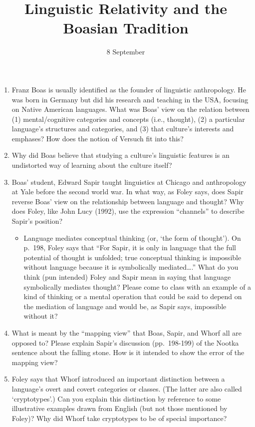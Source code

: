 \documentclass[doc,12pt]{apa6}
\providecommand{\tightlist}{%
  \setlength{\itemsep}{0pt}\setlength{\parskip}{0pt}}
\begin{document}
\title{Linguistic Relativity and the Boasian Tradition}
\author{8 September}
\maketitle

\begin{enumerate}
\def\labelenumi{\arabic{enumi}.}
\tightlist
\item
  Franz Boas is usually identified as the founder of linguistic
  anthropology. He was born in Germany but did his research and teaching
  in the USA, focusing on Native American languages. What was Boas' view
  on the relation between (1) mental/cognitive categories and concepts
  (i.e., thought), (2) a particular language's structures and
  categories, and (3) that culture's interests and emphases? How does
  the notion of Versuch fit into this?
\item
  Why did Boas believe that studying a culture's linguistic features is
  an undistorted way of learning about the culture itself?
\item
  Boas' student, Edward Sapir taught linguistics at Chicago and
  anthropology at Yale before the second world war. In what way, as
  Foley says, does Sapir reverse Boas' view on the relationship between
  language and thought? Why does Foley, like John Lucy (1992), use the
  expression ``channels'' to describe Sapir's position?

  \begin{itemize}
  \tightlist
  \item
    Language mediates conceptual thinking (or, `the form of thought').
    On p.~198, Foley says that ``For Sapir, it is only in language that
    the full potential of thought is unfolded; true conceptual thinking
    is impossible without language because it is symbolically
    mediated\ldots{}.'' What do you think (pun intended) Foley and Sapir
    mean in saying that language symbolically mediates thought? Please
    come to class with an example of a kind of thinking or a mental
    operation that could be said to depend on the mediation of language
    and would be, as Sapir says, impossible without it?
  \end{itemize}
\item
  What is meant by the ``mapping view'' that Boas, Sapir, and Whorf all
  are opposed to? Please explain Sapir's discussion (pp.~198-199) of the
  Nootka sentence about the falling stone. How is it intended to show
  the error of the mapping view?
\item
  Foley says that Whorf introduced an important distinction between a
  language's overt and covert categories or classes. (The latter are
  also called `cryptotypes'.) Can you explain this distinction by
  reference to some illustrative examples drawn from English (but not
  those mentioned by Foley)? Why did Whorf take cryptotypes to be of
  special importance?


\end{enumerate}
\end{document}
